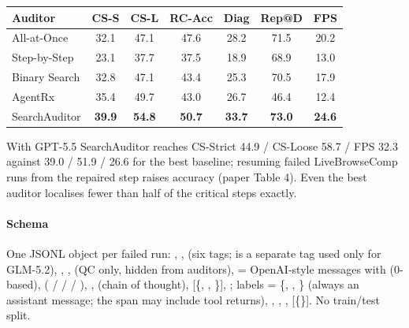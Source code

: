 \begin{center}\small\setlength{\tabcolsep}{3.5pt}
\begin{tabular}{@{}lcccccc@{}}\toprule
Auditor & CS-S & CS-L & RC-Acc & Diag & Rep@D & FPS\\\midrule
All-at-Once & 32.1 & 47.1 & 47.6 & 28.2 & 71.5 & 20.2\\
Step-by-Step & 23.1 & 37.7 & 37.5 & 18.9 & 68.9 & 13.0\\
Binary Search & 32.8 & 47.1 & 43.4 & 25.3 & 70.5 & 17.9\\
AgentRx & 35.4 & 49.7 & 43.0 & 26.7 & 46.4 & 12.4\\
SearchAuditor & \textbf{39.9} & \textbf{54.8} & \textbf{50.7} & \textbf{33.7} & \textbf{73.0} & \textbf{24.6}\\\bottomrule
\end{tabular}
\end{center}
With GPT-5.5 SearchAuditor reaches CS-Strict 44.9 / CS-Loose 58.7 / FPS 32.3 against 39.0 / 51.9 / 26.6 for the best baseline; resuming failed LiveBrowseComp runs from the repaired step raises accuracy (paper Table 4). Even the best auditor localises fewer than half of the critical steps exactly.

\paragraph{Schema} One JSONL object per failed run: , ,  (six tags;  is a separate tag used only for GLM-5.2), , ,  (QC only, hidden from auditors),  = OpenAI-style messages with  (0-based),  ( /  /  / ), ,  (chain of thought),  [\{, , \}], ; labels  = \{, , \} (always an assistant message; the span may include tool returns), , , ,  [\{\}]. No train/test split.

